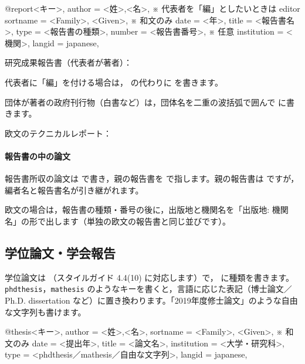 \begin{bibtemplate}
@report{<キー>,
  author      = {<姓>,<名>},         ※ 代表者を「編」としたいときは editor
  sortname    = {<Family>, <Given>}, ※ 和文のみ
  date        = {<年>},
  title       = {<報告書名>},
  type        = {<報告書の種類>},
  number      = {<報告書番号>},      ※ 任意
  institution = {<機関>},
  langid      = {japanese},
}
\end{bibtemplate}

研究成果報告書（代表者が著者）：


代表者に「編」を付ける場合は， の代わりに  を書きます。


団体が著者の政府刊行物（白書など）は，団体名を二重の波括弧で囲んで  に書きます。


欧文のテクニカルレポート：


\paragraph{報告書の中の論文}
報告書所収の論文は  で書き，親の報告書を  で指します。親の報告書は  ですが，編者名と報告書名が引き継がれます。


欧文の場合は，報告書の種類・番号の後に，出版地と機関名を「出版地: 機関名」の形で出します（単独の欧文の報告書と同じ並びです）。


\subsection{学位論文・学会報告}\label{sec:thesis}
学位論文は （スタイルガイド 4.4(10) に対応します）で， に種類を書きます。\texttt{phdthesis}，\texttt{mathesis} のようなキーを書くと，言語に応じた表記（博士論文／Ph.D. dissertation など）に置き換わります。「2019年度修士論文」のような自由な文字列も書けます。

\begin{bibtemplate}
@thesis{<キー>,
  author      = {<姓>,<名>},
  sortname    = {<Family>, <Given>},   ※ 和文のみ
  date        = {<提出年>},
  title       = {<論文名>},
  institution = {<大学・研究科>},
  type        = {<phdthesis／mathesis／自由な文字列>},
  langid      = {japanese},
}
\end{bibtemplate}

